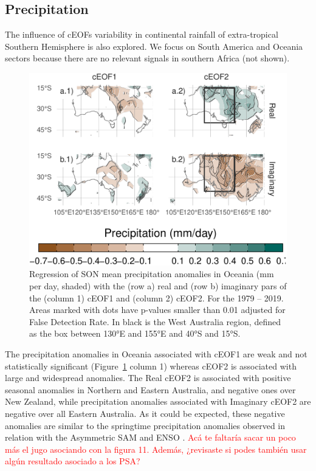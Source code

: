 \documentclass[smallextended]{svjour3}       %
\begin{document}
\hypertarget{precipitation}{%
\subsection{Precipitation}\label{precipitation}}

The influence of cEOFs variability in continental rainfall of extra-tropical Southern Hemisphere is also explored.
We focus on South America and Oceania sectors because there are no relevant signals in southern Africa (not shown).



\begin{figure}
\centering
\includegraphics{../figures/pp-oceania-1.pdf}
\caption{\label{fig:pp-oceania}Regression of SON mean precipitation anomalies in Oceania (mm per day, shaded) with the (row a) real and (row b) imaginary pars of the (column 1) cEOF1 and (column 2) cEOF2. For the 1979 -- 2019. Areas marked with dots have p-values smaller than 0.01 adjusted for False Detection Rate. In black is the West Australia region, defined as the box between 130°E and 155°E and 40°S and 15°S.}
\end{figure}

The precipitation anomalies in Oceania associated with cEOF1 are weak and not statistically significant (Figure~\ref{fig:pp-oceania} column 1) whereas cEOF2 is associated with large and widespread anomalies. The Real cEOF2 is associated with positive seasonal anomalies in Northern and Eastern Australia, and negative ones over New Zealand, while precipitation anomalies associated with Imaginary cEOF2 are negative over all Eastern Australia. As it could be expected, these negative anomalies are similar to the springtime precipitation anomalies observed in relation with the Asymmetric SAM \citep{campitelli2021} and ENSO \citep{cai2011}.
\textcolor{red}{Acá te faltaría  sacar un poco más el jugo asociando con la figura 11. Además, ¿revisaste si podes también usar algún resultado asociado a los PSA? }
\end{document}
